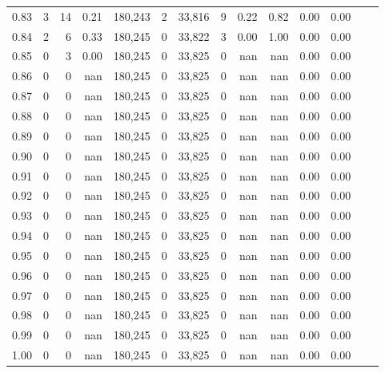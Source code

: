 \begin{tabular}{rrrrrrrrrrrrrr}
0.83 &      3 &     14 &    0.21 &  180,243 &        2 &  33,816 &       9 &  0.22 &  0.82 &  0.00 &      0.00 \\
0.84 &      2 &      6 &    0.33 &  180,245 &        0 &  33,822 &       3 &  0.00 &  1.00 &  0.00 &      0.00 \\
0.85 &      0 &      3 &    0.00 &  180,245 &        0 &  33,825 &       0 &   nan &   nan &  0.00 &      0.00 \\
0.86 &      0 &      0 &     nan &  180,245 &        0 &  33,825 &       0 &   nan &   nan &  0.00 &      0.00 \\
0.87 &      0 &      0 &     nan &  180,245 &        0 &  33,825 &       0 &   nan &   nan &  0.00 &      0.00 \\
0.88 &      0 &      0 &     nan &  180,245 &        0 &  33,825 &       0 &   nan &   nan &  0.00 &      0.00 \\
0.89 &      0 &      0 &     nan &  180,245 &        0 &  33,825 &       0 &   nan &   nan &  0.00 &      0.00 \\
0.90 &      0 &      0 &     nan &  180,245 &        0 &  33,825 &       0 &   nan &   nan &  0.00 &      0.00 \\
0.91 &      0 &      0 &     nan &  180,245 &        0 &  33,825 &       0 &   nan &   nan &  0.00 &      0.00 \\
0.92 &      0 &      0 &     nan &  180,245 &        0 &  33,825 &       0 &   nan &   nan &  0.00 &      0.00 \\
0.93 &      0 &      0 &     nan &  180,245 &        0 &  33,825 &       0 &   nan &   nan &  0.00 &      0.00 \\
0.94 &      0 &      0 &     nan &  180,245 &        0 &  33,825 &       0 &   nan &   nan &  0.00 &      0.00 \\
0.95 &      0 &      0 &     nan &  180,245 &        0 &  33,825 &       0 &   nan &   nan &  0.00 &      0.00 \\
0.96 &      0 &      0 &     nan &  180,245 &        0 &  33,825 &       0 &   nan &   nan &  0.00 &      0.00 \\
0.97 &      0 &      0 &     nan &  180,245 &        0 &  33,825 &       0 &   nan &   nan &  0.00 &      0.00 \\
0.98 &      0 &      0 &     nan &  180,245 &        0 &  33,825 &       0 &   nan &   nan &  0.00 &      0.00 \\
0.99 &      0 &      0 &     nan &  180,245 &        0 &  33,825 &       0 &   nan &   nan &  0.00 &      0.00 \\
1.00 &      0 &      0 &     nan &  180,245 &        0 &  33,825 &       0 &   nan &   nan &  0.00 &      0.00 \\
\bottomrule
\end{tabular}
